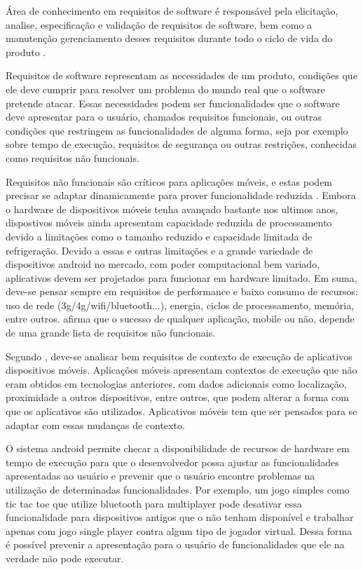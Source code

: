 Área de conhecimento em requisitos de software é responsável pela elicitação, analise, especificação e validação de requisitos de software, bem como a manutenção gerenciamento desses requisitos durante todo o ciclo de vida do produto \cite{swebok}.

Requisitos de software representam as necessidades de um produto, condições que ele deve cumprir para resolver um problema do mundo real que o software pretende atacar. Essas necessidades podem ser funcionalidades que o software deve apresentar para o usuário, chamados requisitos funcionais, ou outras condições que restringem as funcionalidades de alguma forma, seja por exemplo sobre tempo de execução, requisitos de segurança ou outras restrições, conhecidas como requisitos não funcionais.

Requisitos não funcionais são críticos para aplicações móveis, e estas podem precisar se adaptar dinamicamente para prover funcionalidade reduzida \cite{eswmobile}. Embora o hardware de dispositivos móveis tenha avançado bastante nos ultimos anos, dispostivos móveis ainda apresentam capacidade reduzida de processamento devido a limitações como o tamanho reduzido e capacidade limitada de refrigeração. Devido a essas e outras limitações e a grande variedade de dispositivos android no mercado, com poder computacional bem variado, aplicativos devem ser projetados para funcionar em hardware limitado. Em suma, deve-se pensar sempre em requisitos de performance e baixo consumo de recursos: uso de rede (3g/4g/wifi/bluetooth...), energia, ciclos de processamento, memória, entre outros.  afirma que o sucesso de qualquer aplicação, mobile ou não, depende de uma grande lista de requisitos não funcionais.  

Segundo , deve-se analisar bem requisitos de contexto de execução de aplicativos dispositivos móveis. Aplicações móveis apresentam contextos de execução que não eram obtidos em tecnologias anteriores, com dados adicionais como localização, proximidade a outros dispositivos, entre outros, que podem alterar a forma com que os aplicativos são utilizados. Aplicativos móveis tem que ser pensados para se adaptar com essas mudanças de contexto.

O sistema android permite checar a disponibilidade de recursos de hardware em tempo de execução para que o desenvolvedor possa ajustar as funcionalidades apresentadas ao usuário e prevenir que o usuário encontre problemas na utilização de determinadas funcionalidades. Por exemplo, um jogo simples como tic tac toe que utilize bluetooth para multiplayer pode desativar essa funcionalidade para dispositivos antigos que o não tenham disponível e trabalhar apenas com jogo single player contra algum tipo de jogador virtual. Dessa forma é possível prevenir a apresentação para o usuário de funcionalidades que ele na verdade não pode executar.

